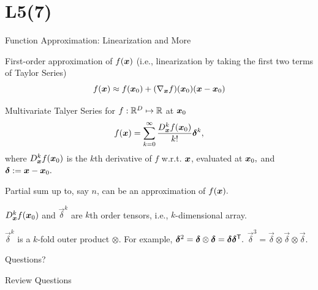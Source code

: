 \documentclass[handout,fleqn,aspectratio=169]{beamer}
\begin{document}
\section{L5(7)}
\begin{frame}{Function Approximation: Linearization and More}

\plitemsep 0.1in

\bci 
\item First-order approximation of $f(\bm{x})$ (i.e., linearization by taking the first two terms of Taylor Series)
$$
f(\bm{x}) \approx f(\bm{x}_0) + (\nabla _{\bm{x}} f)(\bm{x}_0)(\bm{x}-\bm{x}_0)
$$

\item Multivariate Talyer Series for $f: {\mathbb R}^D \mapsto {\mathbb R}$ at $\bm{x}_0$
$$
f(\bm{x}) = \sum_{k=0}^\infty \frac{D^k_{\bm{x}} f(\bm{x}_0)}{k!} \bm{\delta}^k,
$$
where $D^k_{\bm{x}} f(\bm{x}_0)$ is the $k$th derivative of $f$ w.r.t. $\bm{x}$, evaluated at $\bm{x}_0,$ and $\bm{\delta} := \bm{x} - \bm{x}_0.$
\bci
\item Partial sum up to, say $n$, can be an approximation of $f(\bm{x}).$
\item $D^k_{\bm{x}} f(\bm{x}_0)$ and $\vec{\delta}^k$ are $k$th order tensors, i.e., $k$-dimensional array. 

\item $\vec{\delta}^k$ is a $k$-fold outer product $\otimes$. For example, $\bm{\delta}^2 = \bm{\delta} \otimes \bm{\delta} = \bm{\delta}{\bm{\delta}}^{\mathsf{T}}.$ $\vec{\delta}^3 = \vec{\delta} \otimes \vec{\delta} \otimes \vec{\delta}.$ 
\eci

\eci



\end{frame}



\begin{frame}{}
\vspace{2cm}
\LARGE Questions?


\end{frame}

\begin{frame}{Review Questions}
\bce[1)]
\item 

\ece
\end{frame}
\end{document}
